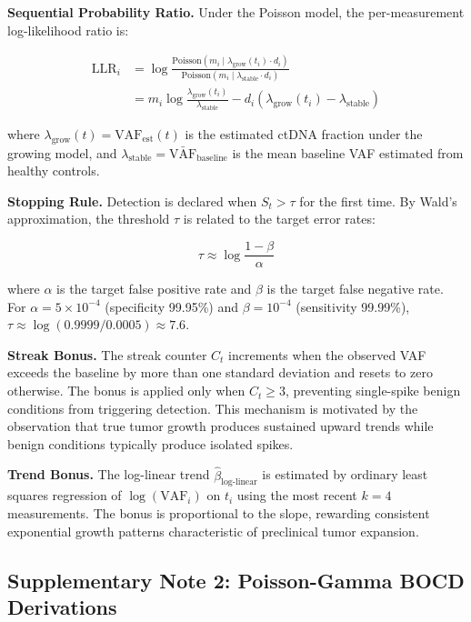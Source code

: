 \documentclass[10pt,a4paper]{article}
\begin{document}
\textbf{Sequential Probability Ratio.} Under the Poisson model, the per-measurement log-likelihood ratio is:

\begin{align}
\text{LLR}_i &= \log \frac{\text{Poisson}(m_i \mid \lambda_{\text{grow}}(t_i) \cdot d_i)}{\text{Poisson}(m_i \mid \lambda_{\text{stable}} \cdot d_i)} \\
&= m_i \log \frac{\lambda_{\text{grow}}(t_i)}{\lambda_{\text{stable}}} - d_i(\lambda_{\text{grow}}(t_i) - \lambda_{\text{stable}})
\end{align}

where $\lambda_{\text{grow}}(t) = \text{VAF}_{\text{est}}(t)$ is the estimated ctDNA fraction under the growing model, and $\lambda_{\text{stable}} = \bar{\text{VAF}}_{\text{baseline}}$ is the mean baseline VAF estimated from healthy controls.

\textbf{Stopping Rule.} Detection is declared when $S_t > \tau$ for the first time. By Wald's approximation, the threshold $\tau$ is related to the target error rates:

\begin{equation}
\tau \approx \log \frac{1 - \beta}{\alpha}
\end{equation}

where $\alpha$ is the target false positive rate and $\beta$ is the target false negative rate. For $\alpha = 5 \times 10^{-4}$ (specificity 99.95\%) and $\beta = 10^{-4}$ (sensitivity 99.99\%), $\tau \approx \log(0.9999 / 0.0005) \approx 7.6$.

\textbf{Streak Bonus.} The streak counter $C_t$ increments when the observed VAF exceeds the baseline by more than one standard deviation and resets to zero otherwise. The bonus is applied only when $C_t \geq 3$, preventing single-spike benign conditions from triggering detection. This mechanism is motivated by the observation that true tumor growth produces sustained upward trends while benign conditions typically produce isolated spikes.

\textbf{Trend Bonus.} The log-linear trend $\hat{\beta}_{\text{log-linear}}$ is estimated by ordinary least squares regression of $\log(\text{VAF}_i)$ on $t_i$ using the most recent $k = 4$ measurements. The bonus is proportional to the slope, rewarding consistent exponential growth patterns characteristic of preclinical tumor expansion.

\subsection*{Supplementary Note 2: Poisson-Gamma BOCD Derivations}
\end{document}
